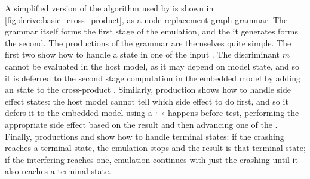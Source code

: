 A simplified version of the algorithm used by {\technique} is shown in
\autoref{fig:derive:basic_cross_product}, as a node replacement graph
grammar.  The grammar itself forms the first stage of the emulation,
and the {\StateMachine} it generates forms the second.  The
productions of the grammar are themselves quite simple.  The first two
show how to handle a  state in one of the input
{\StateMachines}.  The discriminant $m$ cannot be evaluated in the
host model, as it may depend on {\StateMachine} model state, and so it
is deferred to the second stage computation in the embedded model by
adding an  state to the cross-product {\StateMachine}.
Similarly, production  shows how to handle side effect
states: the host model cannot tell which side effect to do first, and
so it defers it to the embedded model using a $\leftarrowtail$
happens-before test, performing the appropriate side effect based on
the result and then advancing one of the {\StateMachines}.  Finally,
productions  and  show how to handle terminal
states: if the crashing {\StateMachine} reaches a terminal state, the
emulation stops and the result is that terminal state; if the
interfering {\StateMachine} reaches one, emulation continues with just
the crashing {\StateMachine} until it also reaches a terminal state.

